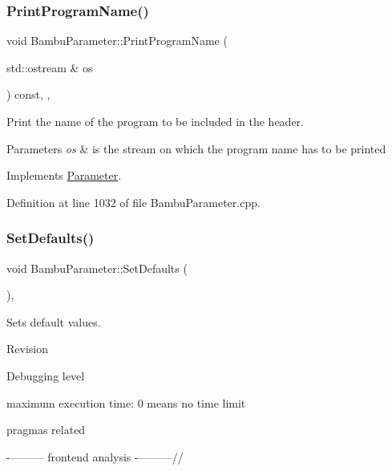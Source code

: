 \subsubsection{\texorpdfstring{Print\+Program\+Name()}{PrintProgramName()}}
{\footnotesize\ttfamily void Bambu\+Parameter\+::\+Print\+Program\+Name (\begin{DoxyParamCaption}\item[{std\+::ostream \&}]{os }\end{DoxyParamCaption}) const\hspace{0.3cm}{\ttfamily [override]}, {\ttfamily [private]}, {\ttfamily [virtual]}}



Print the name of the program to be included in the header. 


\begin{DoxyParams}{Parameters}
{\em os} & is the stream on which the program name has to be printed \\
\hline
\end{DoxyParams}


Implements \hyperlink{classParameter_afe71fca464da99b2ff720d3ad15df051}{Parameter}.



Definition at line 1032 of file Bambu\+Parameter.\+cpp.

\mbox{\label{classBambuParameter_a248447b97f9e6302fc1a356d1a34333e}} 
\subsubsection{\texorpdfstring{Set\+Defaults()}{SetDefaults()}}
{\footnotesize\ttfamily void Bambu\+Parameter\+::\+Set\+Defaults (\begin{DoxyParamCaption}{ }\end{DoxyParamCaption})\hspace{0.3cm}{\ttfamily [override]}, {\ttfamily [virtual]}}



Sets default values. 

Revision

Debugging level

maximum execution time\+: 0 means no time limit

pragmas related

-\/--------- frontend analysis -\/---------//

